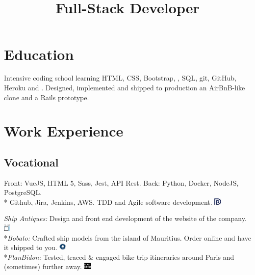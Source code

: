 \documentclass[11pt,a4paper,sans]{moderncv}
\title{Full-Stack Developer}
\begin{document}
\makecvtitle

\section{Education}
{Intensive coding school learning HTML, CSS, Bootstrap, ,
SQL, git, GitHub, Heroku and . Designed, implemented and shipped to
production an AirBnB-like clone and a Rails prototype.} 


\section{Work Experience}
\subsection{Vocational}

{{ Front: VueJS, HTML 5, Sass, Jest, API Rest. Back: Python, Docker, NodeJS, PostgreSQL. \\* Github, Jira, Jenkins, AWS. TDD and Agile software development.} \href{https://www.deepreach.com/}   {\includegraphics[height=10pt]{dp-logo.png}}}

{{\textit{Ship Antiques:} Design and front end development of the website of the company. \href{https://shipantiques.herokuapp.com/}   {\includegraphics[height=10pt]{ship-antiques-logo.png}}}
\\*{\textit{Bobato:}  Crafted ship models from the island of Mauritius. Order online and have it shipped to you. \href{https://bobato-prk.herokuapp.com/}   {\includegraphics[height=10pt]{bobato-logo.png}}}
\\*{\textit{PlanBidon:}  Tested, traced & engaged bike trip itineraries around Paris and (sometimes) further away. \href{https://planbidon.herokuapp.com/}   {\includegraphics[height=10pt]{plan-bidon-logo.png}}}}
\end{document}

